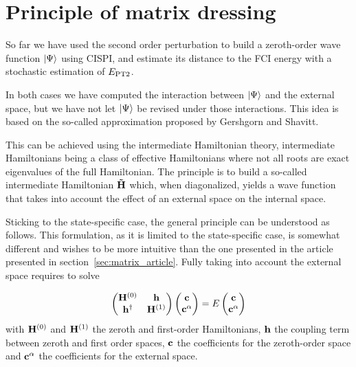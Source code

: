 \documentclass[./thesis.tex]{subfiles}
\begin{document}
\section{Principle of matrix dressing}

So far we have used the second order perturbation to build a zeroth-order wave function $\ket \Psi$ using CISPI, and estimate its distance to the FCI energy with a stochastic estimation of $E_\text{PT2}$.

In both cases we have computed the interaction between $\ket \Psi$ and the external space, but we have not let $\ket \Psi$ be revised under those interactions. This idea is based on the so-called \Bk approximation proposed by Gershgorn and Shavitt.\cite{Gershgorn_1968}

This can be achieved using the intermediate Hamiltonian theory,\cite{0305-4470-18-5-014} intermediate Hamiltonians being a class of effective Hamiltonians\cite{lindgren1982atomic} where not all roots are exact eigenvalues of the full Hamiltonian.
The principle is to build a so-called intermediate Hamiltonian ${\bf \tilde H}$ which, when diagonalized, yields a wave function that takes into account the effect of an external space on the internal space. 


Sticking to the state-specific case, the general principle can be understood as follows. This formulation, as it is limited to the state-specific case, is somewhat different and wishes to be more intuitive than the one presented in the article presented in section~\ref{sec:matrix_article}.
Fully taking into account the external space requires to solve 

\newcommand{\Hzero}{{H}^{(0)}}
\newcommand{\hcplbold}{{\bf h}}
\newcommand{\Hzerobold}{{\bf H}^{(0)}}
\newcommand{\hcpl}{{h}}

\begin{equation}
\begin{pmatrix}
\Hzerobold &  \hcplbold\\ 
\hcplbold^\dagger & {\bf H}^{(1)}
\end{pmatrix} \begin{pmatrix}
{\bf c}\\ 
{\bf c}^\alpha
\end{pmatrix}=E\begin{pmatrix}
{\bf c}\\ 
{\bf c}^\alpha
\end{pmatrix}
\end{equation}
with ${\bf H}^{(0)}$ and ${\bf H}^{(1)}$ the zeroth and first-order Hamiltonians, $\bf h$ the coupling term between zeroth and first order spaces, ${\bf c}$ the coefficients for the zeroth-order space and ${\bf c}^\alpha$ the coefficients for the external space.
\end{document}
